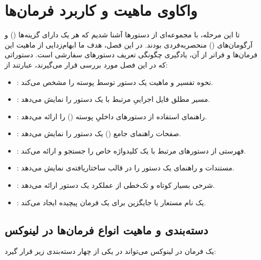 \chapter{واکاوی ماهیت و کاربرد فرمان‌ها}

تا این مرحله، با مجموعه‌ای از دستورها آشنا شدیم که هر یک دارای گزینه‌ها () و آرگومان‌های () منحصربه‌فردی بودند. در این فصل، هدف ما ابهام‌زدایی از ماهیت این فرمان‌ها و فراتر از آن، یادگیری چگونگی تعریف دستورهای سفارشی است. دستوراتی که در این فصل مورد بررسی قرار می‌گیرند، عبارتند از:

\begin{itemize}
  \item {}: نحوه تفسیر و ماهیت یک دستور توسط پوسته را مشخص می‌کند.
  \item {}: مسیر مطلق فایل اجراییِ مرتبط با یک دستور را نمایش می‌دهد.
  \item {}: راهنمای استفاده از دستورهای داخلیِ پوسته () را ارائه می‌دهد.
  \item {}: صفحات راهنمای جامع () یک دستور را نمایش می‌دهد.
  \item {}: فهرستی از دستورهای مرتبط با یک کلیدواژه خاص را جستجو و ارائه می‌کند.
  \item {}: مستندات و راهنمای یک دستور را در قالب ساختاریافته‌ی  نمایش می‌دهد.
  \item {}: شرحی بسیار کوتاه و تک‌خطی از عملکرد یک دستور ارائه می‌دهد.
  \item {}: یک نام مستعار یا جایگزین برای یک فرمان پیچیده ایجاد می‌کند.
\end{itemize}

\section{دسته‌بندی و ماهیت انواع فرمان‌ها در لینوکس}

یک فرمان در لینوکس می‌تواند در یکی از چهار دسته‌بندی زیر قرار گیرد:

